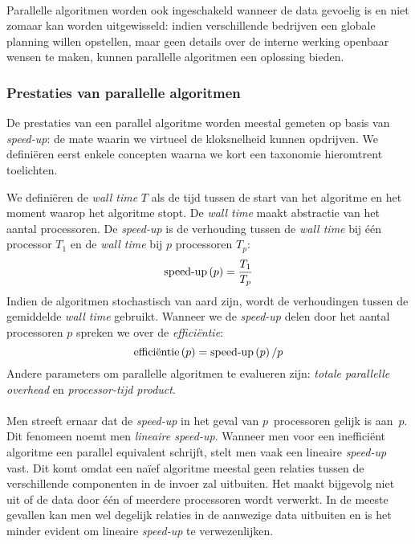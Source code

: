 \paragraph{}
Parallelle algoritmen worden ook ingeschakeld wanneer de data gevoelig is en niet zomaar kan worden uitgewisseld: indien verschillende bedrijven een globale planning willen opstellen, maar geen details over de interne werking openbaar wensen te maken, kunnen parallelle algoritmen een oplossing bieden\cite{Gaspero_amultiagent}.

\subsubsection{Prestaties van parallelle algoritmen}

De prestaties van een parallel algoritme worden meestal gemeten op basis van \emph{speed-up}: de mate waarin we virtueel de kloksnelheid kunnen opdrijven. We defini\"eren eerst enkele concepten waarna we kort een taxonomie hieromtrent toelichten.

\begin{definition}
We defini\"eren de \emph{wall time} $T$ als de tijd tussen de start van het algoritme en het moment waarop het algoritme stopt. De \emph{wall time} maakt abstractie van het aantal processoren. De \emph{speed-up} is de verhouding tussen de \emph{wall time} bij \'e\'en processor $T_1$ en de \emph{wall time} bij $p$ processoren $T_p$:
\begin{equation}
\mbox{speed-up}\left(p\right)=\displaystyle\frac{T_1}{T_p}
\end{equation}
Indien de algoritmen stochastisch van aard zijn, wordt de verhoudingen tussen de gemiddelde \emph{wall time} gebruikt.
Wanneer we de \emph{speed-up} delen door het aantal processoren $p$ spreken we over de \emph{effici\"entie}:
\begin{equation}
\mbox{effici\"entie}\left(p\right)=\mbox{speed-up}\left(p\right)/p
\end{equation}
Andere parameters om parallelle algoritmen te evalueren zijn: \emph{totale parallelle overhead} en \emph{processor-tijd product}\cite{books/bc/KumarGGK94}.
\end{definition}

\paragraph{}
Men streeft ernaar dat de \emph{speed-up} in het geval van $p$~processoren gelijk is aan~$p$. Dit fenomeen noemt men \emph{lineaire speed-up}. Wanneer men voor een ineffici\"ent algoritme een parallel equivalent schrijft, stelt men vaak een lineaire \emph{speed-up} vast. Dit komt omdat een na\"ief algoritme meestal geen relaties tussen de verschillende componenten in de invoer zal uitbuiten. Het maakt bijgevolg niet uit of de data door \'e\'en of meerdere processoren wordt verwerkt. In de meeste gevallen kan men wel degelijk relaties in de aanwezige data uitbuiten en is het minder evident om lineaire \emph{speed-up} te verwezenlijken.

